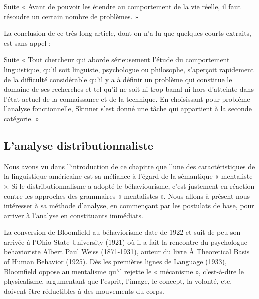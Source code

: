\begin{lecture}{Suite}
« Avant de pouvoir les étendre au comportement de la vie réelle, il faut résoudre un certain nombre de problèmes. »
\end{lecture}

La conclusion de ce très long article, dont on n’a lu que quelques courts extraits, est sans appel :\par

\begin{lecture}{Suite}
« Tout chercheur qui aborde sérieusement l’étude du comportement linguistique, qu’il soit linguiste, psychologue ou philosophe, s’aperçoit rapidement de la difficulté considérable qu’il y a à définir un problème qui constitue le domaine de ses recherches et tel qu’il ne soit ni trop banal ni hors d’atteinte dans l’état actuel de la connaissance et de la technique. En choisissant pour problème l’analyse fonctionnelle, Skinner s’est donné une tâche qui appartient à la seconde catégorie. »
\end{lecture}


\subsection{L'analyse distributionnaliste}
Nous avons vu dans l'introduction de ce chapitre que l’une des caractéristiques de la linguistique américaine est sa méfiance à l’égard de la sémantique « mentaliste ». Si le distributionnalisme a adopté le béhaviourisme, c’est justement en réaction contre les approches des grammaires « mentalistes ». Nous allons à présent nous intéresser à sa méthode d’analyse, en commençant par les postulats de base, pour arriver à l’analyse en constituants immédiats.\par

La conversion de Bloomfield au béhaviorisme date de 1922 et suit de peu son arrivée à l'Ohio State University (1921) où il a fait la rencontre du psychologue behavioriste Albert Paul Weiss (1871-1931), auteur du livre À Theoretical Basis of Human Behavior (1925). Dès les premières lignes de Language (1933), Bloomfield oppose au mentalisme qu’il rejette le « mécanisme », c’est-à-dire le physicalisme, argumentant que l’esprit, l’image, le concept, la volonté, etc. doivent être réductibles à des mouvements du corps.\par


